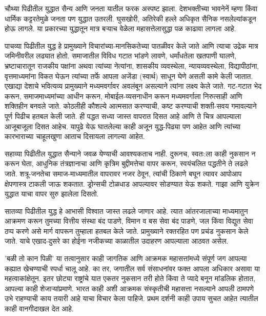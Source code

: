 चौथ्या पिढीतील युद्धात सैन्य आणि जनता यातील फरक अस्पष्ट झाला. देशभक्तीच्या भावनेनें म्हणा किंवा धार्मिक कट्टरतेमुळे जनता पण युद्धात उतरली. घुसखोरी, अतिरेकी हल्ले अधिकृत सैनिक नसलेल्यांकडून होऊ लागले. या प्रकारच्या युद्धातून मात्र बऱ्याच वेळेला महासत्तेलासुद्धा पळ काढावा लागला आहे.

पाचव्या पिढीतील युद्ध हे प्रामुख्याने विचारांच्या-मानसिकतेच्या पातळीवर केले जाते आणि त्याचा उद्रेक मात्र जमिनीवरील लढ्यात होतो. समाजातील विविध गटात भांडणे लावणे, धर्मांधतेला खतपाणी घालणे, भ्रष्टाचारातून राजकीय पक्षांना अथवा त्यांच्या नेत्यांना, शासकीय व्यवस्थेला, न्यायव्यवस्थेला, विद्यापीठांना, वृत्तमाध्यमांना विकत घेऊन त्यांच्या तर्फे आपला अजेंडा (स्वार्थ) साधून घेणे असली कामे केली जातात. एखाद्या देशाचे भवित्यव्य प्रामुख्याने मध्यमवर्गावर अवलंबून असल्याने त्यांना लक्ष्य केले जाते. गट-गटात भेद करून, समाजमाध्यमांच्या आधीन करून, मोबाईल-व्यसनाधीन करून मध्यमवर्गाला निरुत्साही आणि शक्तिहीन बनवले जाते. कोठलीही कौशल्ये आत्मसात करण्याची, कष्ट करण्याची शक्ती-सवय गमावल्याने पूर्ण पिढीच हतबल केली जाते. ही पद्धत सध्या जास्त वापरात दिसत आहे आणि ते चित्र आपल्याला आजूबाजूला दिसत आहेच. यापुढे येऊ घातलेल्या काही अजून युद्ध-पिढ्या पण आहेत आणि त्यांच्या कारभाराच्या चाहूलखुणा आताच दिसायला लागल्या आहेत.

सहाव्या पिढीतील युद्धात सैन्याने जवळ येण्याची आवश्यकताच नाही. दुरूनच, स्वतः:ला काही नुकसान न करून घेता, आधुनिक तंत्रज्ञानाचा आणि कृत्रिम बुद्दीमत्तेचा वापर करून, स्वयंचलित पद्धतीने ते लढले जाते. शत्रू-जनतेचा समाज-माध्यमातील वापरावर नजर ठेवून, त्यांची ठिकाणे बघून त्यावर आपोआप क्षेपणास्त्र टाकली जाऊ शकतात. ड्रोन्सची टोळधाड आपल्यावर सोडण्यात येऊ शकते. गाझा आणि युक्रेन युद्धात याचा वापर सुरु झालेला दिसतो.

सातव्या पिढीतील युद्ध हे आभासी विश्वात जास्त लढले जाणार आहे. त्यात आंतरजालाच्या माध्यमातुन आक्रमण करून तुमच्या वित्तीय संस्था बंद पाडणे, विमान व बस सेवा बंद पाडणे, जल किंवा विद्युत सेवा ठप्प करणे असे मार्ग वापरून तुम्हाला हतबल केले जाते. प्रामुख्याने रक्तरहित पण प्रचंड नुकसान केले जाते. याचे एखाद-दुसरे का होईना नजीकच्या काळातील उदाहरण आपल्याला आठवत असेल.

'बळी तो कान पिळी' या तत्वानुसार काही जागतिक आणि आक्रमक महासत्तांमध्ये संपूर्ण जग आपल्या कह्यात खेचण्याची स्पर्धा चालू आहे. का तर, जगातील सर्व संसाधनांवर फक्त आपला अधिकार असावा या महत्वाकांक्षेतून. इतर छोट्या राष्ट्रांचे यात एकतर नुकसान तरी होते किंवा ते प्यादे बनून मांडलिक होतात, आपल्या काही शेजाऱ्यांप्रमाणे. भारत काही अशी आक्रमक संस्कृतीची महासत्ता नसल्याने आपली ठामपणे उभे राहण्याची काय तयारी आहे याचा विचार केला पाहिजे. प्रथम दर्शनी काही उपाय सुचत आहेत त्यातील काही वानगीदाखल देत आहे.

